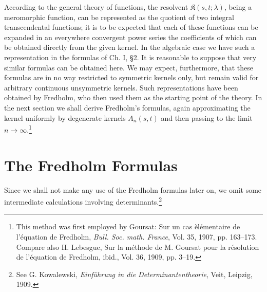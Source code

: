 According to the general theory of functions, the resolvent $\mathfrak{K}(s,t;\lambda)$, being a meromorphic function, can be represented as the quotient of two integral transcendental functions; it is to be expected that each of these functions can be expanded in an everywhere convergent power series the coefficients of which can be obtained directly from the given kernel. In the algebraic case we have such a representation in the formulas of Ch. I, \S2. It is reasonable to suppose that very similar formulas can be obtained here. We may expect, furthermore, that these formulas are in no way restricted to symmetric kernels only, but remain valid for arbitrary continuous unsymmetric kernels. Such representations have been obtained by Fredholm, who then used them as the starting point of the theory. In the next section we shall derive Fredholm's formulas, again approximating the kernel uniformly by degenerate kernels $A_n(s,t)$ and then passing to the limit $n\to\infty$.\footnote{This method was first employed by Goursat: Sur un cas \`el\'ementaire de l'\'equation de Fredholm, \emph{Bull. Soc. math. France}, Vol. 35, 1907, pp. 163--173. Compare also H. Lebesgue, Sur la m\'ethode de M. Goursat pour la r\'esolution de l'\'equation de Fredholm, ibid., Vol. 36, 1909, pp. 3--19.}

\section{The Fredholm Formulas}
Since we shall not make any use of the Fredholm formulas later on, we omit some intermediate calculations involving determinants.\footnote{See G. Kowalewski, \emph{Einf\"uhrung in die Determinantentheorie}, Veit, Leipzig, 1909.}

